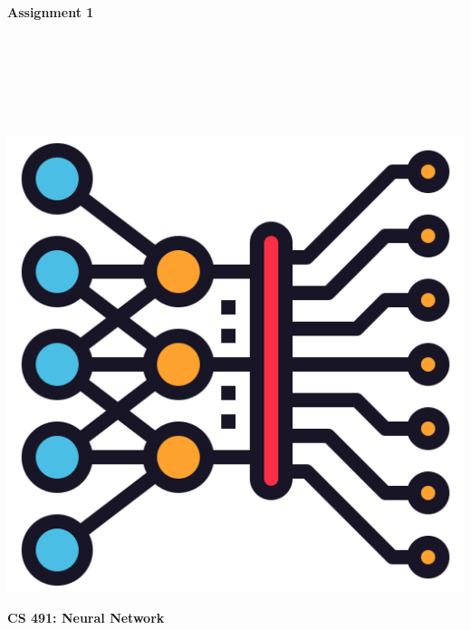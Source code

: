 \documentclass{article}
\begin{document}
\begin{titlepage}
\begin{center}
\vspace*{1cm}
            
\Huge
\textbf{Assignment 1}
            
\vspace{1cm}

\Large
{}

\vspace{2cm}

 \\
 \\
 \\
 \\
 \\

\vspace{2cm}

\includegraphics[scale=0.25]{../figs/icon.png}\\[0.5cm]

\vspace{9cm}

\textbf{CS 491: Neural Network} \\

\end{center}
\end{titlepage}
\end{document}
